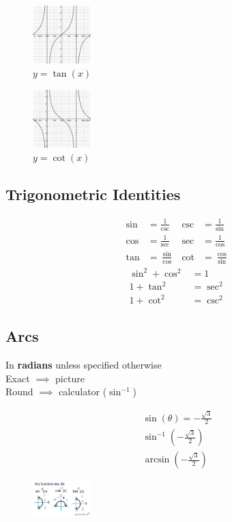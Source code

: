 \documentclass[twocolumn]{article}
\newcommand{\bd}{\textbf}
\begin{document}
	\begin{figure}[H]
		\centering
		\includegraphics[width=0.20\textwidth]{tan.png}
		\caption{$ y = \tan(x) $}
	\end{figure}

	\begin{figure}[H]
		\centering
		\includegraphics[width=0.20\textwidth]{cot.png}
		\caption{$ y = \cot(x) $}
	\end{figure}

	\subsection*{Trigonometric Identities}
	
	\begin{align*}
		\sin &= \frac{1}{\csc}  & \csc & = \frac{1}{\sin} \\
		\cos &= \frac{1}{\sec} & \sec & = \frac{1}{\cos} \\
		\tan &= \frac{\sin}{\cos}  & \cot & = \frac{\cos}{\sin}
	\end{align*}
	\vspace{0pt}
	\begin{align*}
		\sin^2 + \cos^2 &= 1 \\
		1 + \tan^2 &= \sec^2 \\
		1 + \cot^2 &= \csc^2
	\end{align*}
	\vspace{-2.2em}
	\subsection*{Arcs}
	In \bd{radians} unless specified otherwise \\
	Exact $\implies$ picture \\
	Round $\implies$ calculator ($\sin^{-1}$)
	
	\begin{align*}
		\sin(\theta) = -\frac{\sqrt{3}}{2} \\
		\sin^{-1}(-\frac{\sqrt{3}}{2}) \\
		 \arcsin(-\frac{\sqrt{3}}{2})
	\end{align*}

	\begin{figure}[H]
		\centering
		\includegraphics[width=0.20\textwidth]{ArcTrig.jpg}
	\end{figure}
\end{document}
